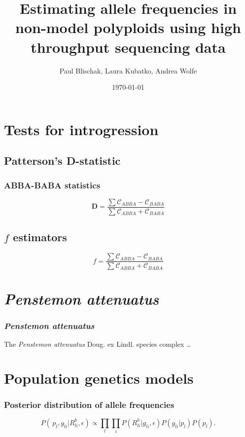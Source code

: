 \documentclass[t,presentation,10pt,xcolor=table]{beamer}
\title[Allele frequencies in polyploids]{Estimating allele frequencies in non-model polyploids using high throughput sequencing data}
\author[Botany 2015]{Paul Blischak, Laura Kubatko, Andrea Wolfe}
\institute[The Ohio State University]
{
Dept. of EEOB \\
The Ohio State University
}
\date{\today}
\begin{document}
\frame{\titlepage}

\section{Tests for introgression}
\subsection{Patterson's D-statistic}

\begin{frame}
\frametitle{ABBA-BABA statistics}
$$\mathbf{D} = \frac{\displaystyle\sum \mathcal{C}_{ABBA}-\mathcal{C}_{BABA}}{\displaystyle\sum \mathcal{C}_{ABBA}+\mathcal{C}_{BABA}}$$
\end{frame}

\subsection{$f$ estimators}

\begin{frame}
$$ f = \frac{\displaystyle\sum \mathcal{C}_{ABBA}-\mathcal{C}_{BABA}}{\displaystyle\sum \mathcal{C}_{ABBA}+\mathcal{C}_{BABA}}$$
\end{frame}

\section{{\it Penstemon attenuatus}}

\begin{frame}
\frametitle{\textit{Penstemon attenuatus}}
The \textit{Penstemon attenuatus} Doug. ex Lindl. species complex \ldots
\end{frame}

\section{Population genetics models}

\begin{frame}
\frametitle{Posterior distribution of allele frequencies}
\begin{equation}
P(\,p_{l},g_{li}|R_{li}^{b},\epsilon) \propto \displaystyle\prod_{l} \displaystyle\prod_{i} P(R_{li}^{b}|g_{li},\epsilon)P(g_{li}|p_{l})P(p_{l}).
\end{equation}
\end{frame}
\end{document}

